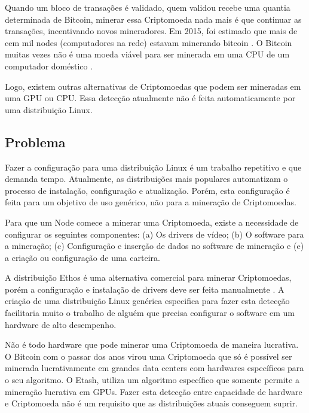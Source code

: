 \documentclass[
article,			%
12pt,				%
openright,			%
oneside,			%
a4paper,			%
chapter=TITLE,		%
section=TITLE,		%
subsection=TITLE,	%
subsubsection=TITLE,%
subsubsubsection=TITLE, %
english,			%
brazil,				%
]{abntex2}
\begin{document}
Quando um bloco de transações é validado, quem validou recebe uma
quantia determinada de Bitcoin, minerar essa Criptomoeda nada mais é
que continuar as transações, incentivando novos mineradores. Em 2015,
foi estimado que mais de cem mil nodes (computadores na rede) estavam
minerando bitcoin \cite{Coin2015}. O Bitcoin muitas vezes não é uma
moeda viável para ser minerada em uma CPU de um computador doméstico
\cite{Bitcoins2018}.

Logo, existem outras alternativas de Criptomoedas que podem ser
mineradas em uma GPU ou CPU\@. Essa detecção atualmente não é feita
automaticamente por uma distribuição Linux. 

\subsection{Problema}

Fazer a configuração para uma distribuição Linux é um trabalho
repetitivo e que demanda tempo. Atualmente, as distribuições mais
populares automatizam o processo de instalação, configuração e
atualização. Porém, esta configuração é feita para um objetivo de uso
genérico, não para a mineração de Criptomoedas.

Para que um Node comece a minerar uma Criptomoeda, existe a
necessidade de configurar os seguintes componentes: (a) Os drivers de
vídeo; (b) O software para a mineração; (c) Configuração e inserção de
dados no software de mineração e (e) a criação ou configuração de uma
carteira. 

A distribuição Ethos é uma alternativa comercial para minerar
Criptomoedas, porém a configuração e instalação de drivers deve ser
feita manualmente \cite{EthOS2018}. A criação de uma distribuição
Linux genérica especifica para fazer esta detecção facilitaria muito o
trabalho de alguém que precisa configurar o software em um hardware de
alto desempenho.

Não é todo hardware que pode minerar uma Criptomoeda de maneira
lucrativa. O Bitcoin com o passar dos anos virou uma Criptomoeda que
só é possível ser minerada lucrativamente em grandes data centers com
hardwares específicos para o seu algoritmo. O Etash, utiliza um
algoritmo específico que somente permite a mineração lucrativa em
GPUs. Fazer esta detecção entre capacidade de hardware e Criptomoeda
não é um requisito que as distribuições atuais conseguem suprir.
\end{document}
